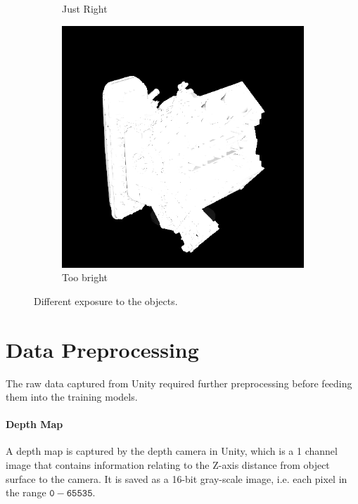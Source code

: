 \begin{figure}[H]
\begin{subfigure}[b]{0.32\linewidth}
		\caption{Just Right}
	\end{subfigure}
	\begin{subfigure}[b]{0.32\linewidth}
		\includegraphics[width=\textwidth]{./Figures/wrong_exposure.png}
		\caption{Too bright}
	\end{subfigure}
	\decoRule
	\caption{Different exposure to the objects.}
	\label{fig:camera_exposure}
\end{figure}




\section{Data Preprocessing}
The raw data captured from Unity required further preprocessing before feeding them into the training models. 
\paragraph{Depth Map}
A depth map is captured by the depth camera in Unity, which is a 1 channel image that contains information relating to the Z-axis distance from object surface to the camera. It is saved as a 16-bit gray-scale image, i.e. each pixel in the range $\mathtt{0 - 65535}$. 

